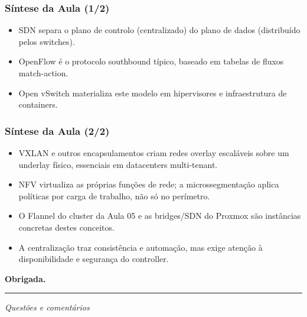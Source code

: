 \documentclass[aspectratio=169]{beamer}
\begin{document}
\begin{frame}
\frametitle{Síntese da Aula \textcolor{NudeTaupe}{\small(1/2)}}
\begin{itemize}
    \setlength\itemsep{0.4cm}
    \item SDN separa o plano de controlo (centralizado) do plano de dados (distribuído pelos switches).
    \item OpenFlow é o protocolo southbound típico, baseado em tabelas de fluxos match-action.
    \item Open vSwitch materializa este modelo em hipervisores e infraestrutura de containers.
\end{itemize}
\end{frame}

\begin{frame}
\frametitle{Síntese da Aula \textcolor{NudeTaupe}{\small(2/2)}}
\begin{itemize}
    \setlength\itemsep{0.4cm}
    \item VXLAN e outros encapsulamentos criam redes overlay escaláveis sobre um underlay físico, essenciais em datacenters multi-tenant.
    \item NFV virtualiza as próprias funções de rede; a microssegmentação aplica políticas por carga de trabalho, não só no perímetro.
    \item O Flannel do cluster da Aula 05 e as bridges/SDN do Proxmox são instâncias concretas destes conceitos.
    \item A centralização traz consistência e automação, mas exige atenção à disponibilidade e segurança do controller.
\end{itemize}
\end{frame}

\begin{frame}[plain]
  \vspace*{3cm}
  \begin{center}
    \Huge\bfseries\textcolor{TextEspresso}{Obrigada.}\par
    \vspace{0.5cm}
    {\color{NudeTaupe}\rule{2cm}{0.5pt}}\par
    \vspace{0.5cm}
    \Large\textcolor{TextEspresso}{\itshape Questões e comentários}
  \end{center}
\end{frame}
\end{document}
